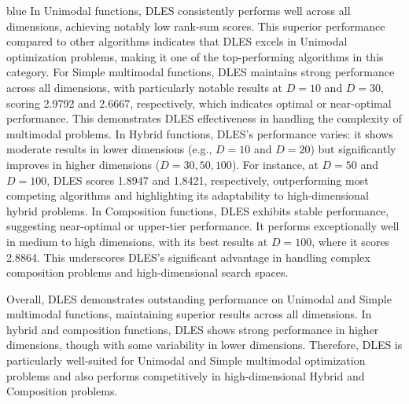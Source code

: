 \documentclass[journal, onecolumn]{IEEEtran}
\begin{document}
\begin{color}{blue}
In Unimodal functions, DLES consistently performs well across all dimensions, achieving notably low rank-sum scores. This superior performance compared to other algorithms indicates that DLES excels in Unimodal optimization problems, making it one of the top-performing algorithms in this category. For Simple multimodal functions, DLES maintains strong performance across all dimensions, with particularly notable results at $D=10$ and $D=30$, scoring 2.9792 and 2.6667, respectively, which indicates optimal or near-optimal performance. This demonstrates DLES effectiveness in handling the complexity of multimodal problems. In Hybrid functions, DLES’s performance varies: it shows moderate results in lower dimensions (e.g., $D=10$ and $D=20$) but significantly improves in higher dimensions ($D=30, 50, 100$). For instance, at $D=50$ and $D=100$, DLES scores 1.8947 and 1.8421, respectively, outperforming most competing algorithms and highlighting its adaptability to high-dimensional hybrid problems. In Composition functions, DLES exhibits stable performance, suggesting near-optimal or upper-tier performance. It performs exceptionally well in medium to high dimensions, with its best results at $D=100$, where it scores 2.8864. This underscores DLES's significant advantage in handling complex composition problems and high-dimensional search spaces.

Overall, DLES demonstrates outstanding performance on Unimodal and Simple multimodal functions, maintaining superior results across all dimensions. In hybrid and composition functions, DLES shows strong performance in higher dimensions, though with some variability in lower dimensions. Therefore, DLES is particularly well-suited for Unimodal and Simple multimodal optimization problems and also performs competitively in high-dimensional Hybrid and Composition problems.


\end{color}
\end{document}
